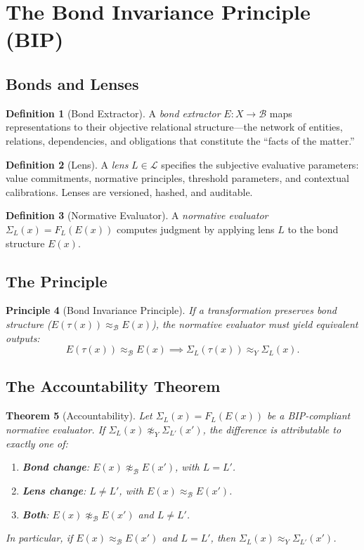 \documentclass[12pt,letterpaper]{article}
\newtheorem{theorem}{Theorem}[section]
\theoremstyle{definition}
\newtheorem{definition}[theorem]{Definition}
\theoremstyle{plain}
\newtheorem{principle}[theorem]{Principle}
\newcommand{\calB}{\mathcal{B}}
\newcommand{\calL}{\mathcal{L}}
\newcommand{\equivY}{\approx_Y}
\newcommand{\equivB}{\approx_{\mathcal{B}}}
\begin{document}
\section{The Bond Invariance Principle (BIP)}
\label{sec:bip}

\subsection{Bonds and Lenses}

\begin{definition}[Bond Extractor]
A \emph{bond extractor} $E: X \to \calB$ maps representations to their objective relational structure---the network of entities, relations, dependencies, and obligations that constitute the ``facts of the matter.''
\end{definition}

\begin{definition}[Lens]
A \emph{lens} $L \in \calL$ specifies the subjective evaluative parameters: value commitments, normative principles, threshold parameters, and contextual calibrations. Lenses are versioned, hashed, and auditable.
\end{definition}

\begin{definition}[Normative Evaluator]
A \emph{normative evaluator} $\Sigma_L(x) = F_L(E(x))$ computes judgment by applying lens $L$ to the bond structure $E(x)$.
\end{definition}

\subsection{The Principle}

\begin{principle}[Bond Invariance Principle]
\label{princ:bip}
If a transformation preserves bond structure ($E(\tau(x)) \equivB E(x)$), the normative evaluator must yield equivalent outputs:
\[
E(\tau(x)) \equivB E(x) \implies \Sigma_L(\tau(x)) \equivY \Sigma_L(x).
\]
\end{principle}

\subsection{The Accountability Theorem}

\begin{theorem}[Accountability]
\label{thm:accountability}
Let $\Sigma_L(x) = F_L(E(x))$ be a BIP-compliant normative evaluator. If $\Sigma_L(x) \not\equivY \Sigma_{L'}(x')$, the difference is attributable to exactly one of:
\begin{enumerate}[label=(\alph*)]
    \item \textbf{Bond change}: $E(x) \not\equivB E(x')$, with $L = L'$.
    \item \textbf{Lens change}: $L \neq L'$, with $E(x) \equivB E(x')$.
    \item \textbf{Both}: $E(x) \not\equivB E(x')$ and $L \neq L'$.
\end{enumerate}
In particular, if $E(x) \equivB E(x')$ and $L = L'$, then $\Sigma_L(x) \equivY \Sigma_{L'}(x')$.
\end{theorem}
\end{document}
